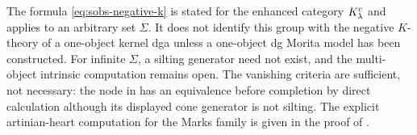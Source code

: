 \begin{remark}[Scope]\label{rem:negative-k-scope}
The formula \eqref{eq:sobs-negative-k} is stated for the enhanced category \(K^c_\lambda\) and applies to an arbitrary set \(\Sigma\).  It does not identify this group with the negative \(K\)-theory of a one-object kernel dga unless a one-object dg Morita model has been constructed.  For infinite \(\Sigma\), a silting generator need not exist, and the multi-object intrinsic computation remains open.  The vanishing criteria are sufficient, not necessary: the node in  has an equivalence before completion by direct calculation although its displayed cone generator is not silting.  The explicit artinian-heart computation for the Marks family is given in the proof of .
\end{remark}